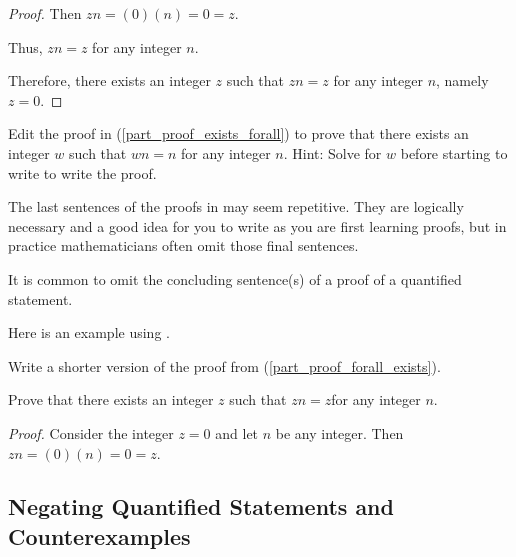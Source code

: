 \begin{act}
\begin{actpart}
\begin{proof}
                \hspace{.75in} \hspace{.75in}Then $zn=(0)(n)=0=z$.  
                
                \hspace{.75in} Thus, $zn=z$ for any integer $n$.  
                
                Therefore, there exists an integer $z$ such that $zn=z$ for any integer $n$, namely $z=0$.
            \end{proof}

        \item Edit the proof in (\ref{part_proof_exists_forall})  to prove that there exists an integer $w$ such that $wn=n$ for any integer $n$. Hint: Solve for $w$ before starting to write to write the proof.
    \end{actpart}
\end{act}

The last sentences of the proofs in  may seem repetitive.  They are logically necessary and a good idea for you to write as you are first learning proofs, but in practice mathematicians often omit those final sentences.

\begin{rem}
\label{rem_omit_last_sentence_proof_quants} 
It is common to omit the concluding sentence(s) of a proof of a quantified statement.  
\end{rem}

Here is an example using .

\begin{exam}
\label{exam_omit_last_sentence_proof_quants}
    Write a shorter version of the proof from  (\ref{part_proof_forall_exists}).
        \begin{soln}
            Prove that there exists an integer $z$ such that $zn=z$for any integer $n$.

            \emph{Proof.}
                Consider the integer $z=0$ and let $n$ be any integer. Then $zn=(0)(n)=0=z.$   
        \end{soln}
\end{exam}

\newcommand{\subcex}{Negating Quantified Statements and Counterexamples}
\subsection{\subcex}
\label{sub_cex}

